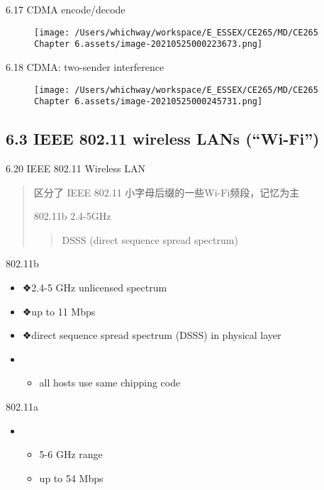 \documentclass[
]{article}
\begin{document}
6.17 CDMA encode/decode

\begin{figure}
\centering
\texttt{[image: /Users/whichway/workspace/E\_ESSEX/CE265/MD/CE265 Chapter 6.assets/image-20210525000223673.png]}
\caption{}
\end{figure}

6.18 CDMA: two-sender interference

\begin{figure}
\centering
\texttt{[image: /Users/whichway/workspace/E\_ESSEX/CE265/MD/CE265 Chapter 6.assets/image-20210525000245731.png]}
\caption{}
\end{figure}

\hypertarget{63-ieee-80211-wireless-lans-wi-fi}{%
\subsection{6.3 IEEE 802.11 wireless LANs
(``Wi-Fi'')}\label{63-ieee-80211-wireless-lans-wi-fi}}

6.20 IEEE 802.11 Wireless LAN

\begin{quote}
区分了 IEEE 802.11 小字母后缀的一些Wi-Fi频段，记忆为主

802.11b 2.4-5GHz

\begin{quote}
DSSS (direct sequence spread spectrum)
\end{quote}
\end{quote}

802.11b

\begin{itemize}
\item
  ❖2.4-5 GHz unlicensed spectrum
\item
  ❖up to 11 Mbps
\item
  ❖direct sequence spread spectrum (DSSS) in physical layer
\item
  \begin{itemize}
  \item
    all hosts use same chipping code
  \end{itemize}
\end{itemize}

802.11a

\begin{itemize}
\item
  \begin{itemize}
  \item
    5-6 GHz range
  \item
    up to 54 Mbps
  \end{itemize}
\end{itemize}
\end{document}
